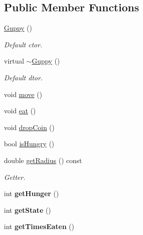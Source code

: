 \subsection*{Public Member Functions}
\begin{DoxyCompactItemize}
\item 
\mbox{\hyperlink{class_guppy_aa78f8b5323b1015c968a8edab52773f5}{Guppy}} ()
\begin{DoxyCompactList}\small\item\em Default ctor. \end{DoxyCompactList}\item 
\mbox{\label{class_guppy_a27768a0a8d6e01a2c0975b18d11fc0ad}} 
virtual \mbox{\hyperlink{class_guppy_a27768a0a8d6e01a2c0975b18d11fc0ad}{$\sim$\+Guppy}} ()
\begin{DoxyCompactList}\small\item\em Default dtor. \end{DoxyCompactList}\item 
void \mbox{\hyperlink{class_guppy_ae6002948d74b3741bed34a7311be4377}{move}} ()
\item 
void \mbox{\hyperlink{class_guppy_afe934262a0988e4ad041f4ed3a1a7e02}{eat}} ()
\item 
void \mbox{\hyperlink{class_guppy_a356d1f45f52684bba3e6e9e7774e59b8}{drop\+Coin}} ()
\item 
bool \mbox{\hyperlink{class_guppy_a47886449d5153f51183cf4e6c46c8548}{is\+Hungry}} ()
\item 
\mbox{\label{class_guppy_a1bc9d78c9d078cd0201b5b140c2fd8e1}} 
double \mbox{\hyperlink{class_guppy_a1bc9d78c9d078cd0201b5b140c2fd8e1}{get\+Radius}} () const
\begin{DoxyCompactList}\small\item\em Getter. \end{DoxyCompactList}\item 
\mbox{\label{class_guppy_af3e5483fbc5d2be93b4a4df6a79614c0}} 
int {\bfseries get\+Hunger} ()
\item 
\mbox{\label{class_guppy_a46acd710b221c294d4aab433b9d62572}} 
int {\bfseries get\+State} ()
\item 
\mbox{\label{class_guppy_afc6527603675fd38bd763fb9aebd9fef}} 
int {\bfseries get\+Times\+Eaten} ()
\item 

\end{DoxyCompactItemize}
